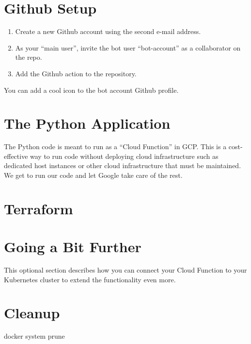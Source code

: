 \section{\label{sec:github}Github Setup}


\justifying
\begin{raggedright}
	\begin{enumerate}
		\item Create a new Github account using the second e-mail address.
		\item As your ``main user'', invite the bot user ``bot-account'' as a collaborator on the repo.
		\item Add the Github action to the repository.
	\end{enumerate}
\end{raggedright}
\vspace{2mm}

\justifying
You can add a cool icon to the bot account Github profile.


\section{\label{sec:Python} The Python Application}

\justifying
The Python code is meant to run as a ``Cloud Function'' in GCP. This is a cost-effective way to run code
without deploying cloud infrastructure such as dedicated host instances or other cloud infrastructure
that must be maintained. We get to run our code and let Google take care of the rest.

\section{\label{sec:Terraform}Terraform}

\section{\label{sec:next}Going a Bit Further}

\justifying
This optional section describes how you can connect your Cloud Function to your Kubernetes cluster to extend the functionality even more.

\section{\label{sec:cleanup}Cleanup}

\justifying

docker system prune


\clearpage
\begin{versionhistory}
\end{versionhistory}

\clearpage




